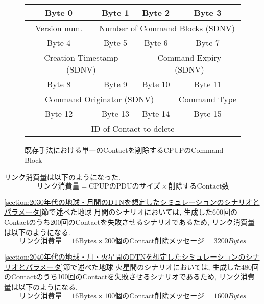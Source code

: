 \begin{figure}[htbp]
    \centering
    \label{figure:delete_command_block_format}
    \begin{tabular}{|c|c|c|c|}
        \hline
        Byte 0 & Byte 1 & Byte 2 & Byte 3 \\
        \hline
        \multicolumn{1}{|c|}{Version num.} & \multicolumn{3}{c|}{Number of Command Blocks (SDNV)} \\
        \hline
        Byte 4 & Byte 5 & Byte 6 & Byte 7  \\
        \hline
        \multicolumn{2}{|c|}{Creation Timestamp (SDNV)} & \multicolumn{2}{c|}{Command Expiry (SDNV)} \\
        \hline
        Byte 8 & Byte 9 & Byte 10 & Byte 11 \\
        \hline
        \multicolumn{3}{|c|}{Command Originator (SDNV)} & Command Type \\
        \hline
        Byte 12 & Byte 13 & Byte 14 & Byte 15 \\
        \hline
        \multicolumn{4}{|c|}{ID of Contact to delete} \\
        \hline
    \end{tabular}
    \caption{既存手法における単一のContactを削除するCPUPのCommand Block}
  \end{figure}

リンク消費量は以下のようになった. 
\begin{equation}
    \text{リンク消費量} = \text{CPUPのPDUのサイズ} \times \text{削除するContact数}
\end{equation}

\ref{section:2030年代の地球・月間のDTNを想定したシミュレーションのシナリオとパラメータ}節で述べた地球-月間のシナリオにおいては, 
生成した600回のContactのうち200回のContactを失敗させるシナリオであるため, リンク消費量は以下のようになる. 
\begin{equation}
    \text{リンク消費量} = 16 \text{Bytes} \times 200 \text{個のContact削除メッセージ} = 3200 {Bytes} 
\end{equation}

\ref{section:2040年代の地球・月・火星間のDTNを想定したシミュレーションのシナリオとパラメータ}節で述べた地球-火星間のシナリオにおいては, 
生成した480回のContactのうち100回のContactを失敗させるシナリオであるため, リンク消費量は以下のようになる. 
\begin{equation}
    \text{リンク消費量} = 16 \text{Bytes} \times 100 \text{個のContact削除メッセージ} = 1600 {Bytes} 
\end{equation}
